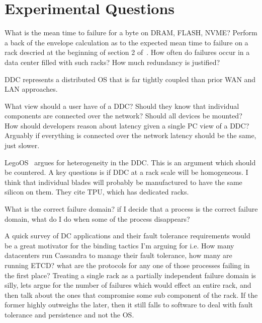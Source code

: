 \section{Experimental Questions}
\label{sec:experiment}

What is the mean time to failure for a byte on DRAM, FLASH, NVME? Perform a
back of the envelope calculation as to the expected mean time to failure on a
rack descried at the beginning of section 2 of~\cite{189914}. How often do
failures occur in a data center filled with such racks? How much redundancy is
justified?

DDC represents a distributed OS that is far tightly coupled than prior WAN and
LAN approaches.

What view should a user have of a DDC? Should they know that individual
components are connected over the network? Should all devices be mounted? How
should developers reason about latency given a single PC view of a DDC?
Arguably if everything is connected over the network latency should be the
same, just slower.

LegoOS~\cite{legoos} argues for heterogeneity in the DDC. This is an argument
which should be countered. A key questions is if DDC at a rack scale will be
homogeneous. I think that individual blades will probably be manufactured to
have the same silicon on them. They cite TPU, which has dedicated racks.

What is the correct failure domain? if I decide that a process is the correct
failure domain, what do I do when some of the process disappears? 

A quick survey of DC applications and their fault tolerance requirements would
be a great motivator for the binding tactics I'm arguing for i.e. How many
datacenters run Cassandra to manage their fault tolerance, how many are
running ETCD? what are the protocols for any one of those processes failing in
the first place? Treating a single rack as a partially independent failure
domain is silly, lets argue for the number of failures which would effect an
entire rack, and then talk about the ones that compromise some sub component of
the rack. If the former highly outweighs the later, then it still falls to
software to deal with fault tolerance and persistence and not the OS.

